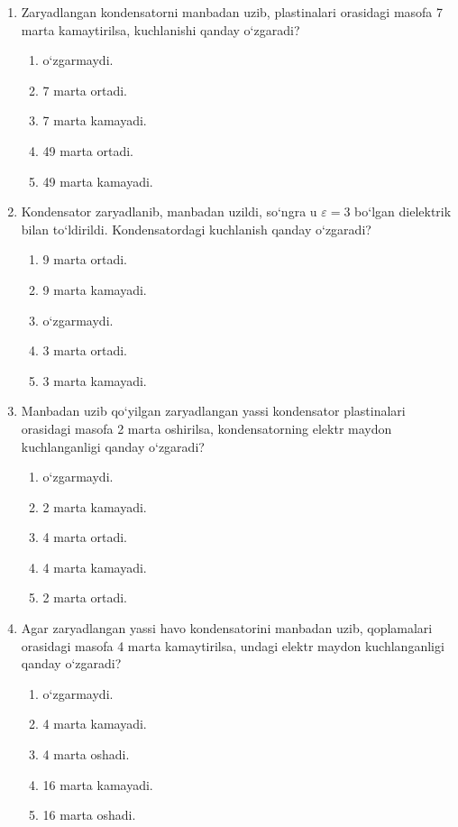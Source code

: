 \begin{enumerate}
\item Zaryadlangan kondensatorni manbadan uzib, plastinalari orasidagi masofa 7 marta kamaytirilsa, kuchlanishi qanday o‘zgaradi?
\begin{enumerate}[label=\Alph*)]
\item o‘zgarmaydi.
\item 7 marta ortadi.
\item 7 marta kamayadi.
\item 49 marta ortadi.
\item 49 marta kamayadi.
\end{enumerate}

\item Kondensator zaryadlanib, manbadan uzildi, so‘ngra u $\varepsilon=3$ bo‘lgan dielektrik bilan to‘ldirildi. Kondensatordagi kuchlanish qanday o‘zgaradi?
\begin{enumerate}[label=\Alph*)]
\item 9 marta ortadi.
\item 9 marta kamayadi.
\item o‘zgarmaydi.
\item 3 marta ortadi.
\item 3 marta kamayadi.
\end{enumerate}

\item Manbadan uzib qo‘yilgan zaryadlangan yassi kondensator plastinalari orasidagi masofa 2 marta oshirilsa, kondensatorning elektr maydon kuchlanganligi qanday o‘zgaradi?
\begin{enumerate}[label=\Alph*)]
\item o‘zgarmaydi.
\item 2 marta kamayadi.
\item 4 marta ortadi.
\item 4 marta kamayadi.
\item 2 marta ortadi.
\end{enumerate}

\item Agar zaryadlangan yassi havo kondensatorini manbadan uzib, qoplamalari orasidagi masofa 4 marta kamaytirilsa, undagi elektr maydon kuchlanganligi qanday o‘zgaradi?
\begin{enumerate}[label=\Alph*)]
\item o‘zgarmaydi.
\item 4 marta kamayadi.
\item 4 marta oshadi.
\item 16 marta kamayadi.
\item 16 marta oshadi.
\end{enumerate}


\end{enumerate}
